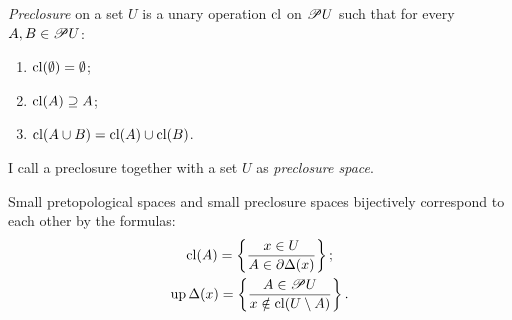 \begin{defn}
\emph{Preclosure} on a set $U$ is a unary operation
$\operatorname{cl}$ on $\mathscr{P} U$ such that for every $A,B\in\mathscr{P} U$:
\begin{enumerate}
\item $\operatorname{cl}(\emptyset)=\emptyset$;
\item $\operatorname{cl}(A)\supseteq A$;
\item $\operatorname{cl}(A\cup B)=\operatorname{cl}(A)\cup\operatorname{cl}(B)$.
\end{enumerate}

I call a preclosure together with a set $U$
as \emph{preclosure space}.

\end{defn}
\begin{thm}
\label{pretop-bij}Small pretopological spaces and small preclosure
spaces bijectively correspond to each other by the formulas:
\begin{gather}
\operatorname{cl}(A)=\left\{ \frac{x\in U}{A\in\partial\Delta(x)}\right\};\label{pt-cl}\\
\operatorname{up}\Delta(x)=\left\{ \frac{A\in\mathscr{P} U}{x\notin\operatorname{cl}(U\setminus A)}\right\}.\label{pt-neigh}
\end{gather}
\end{thm}
